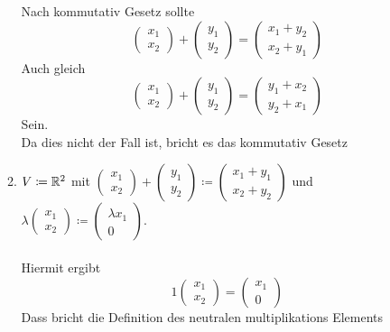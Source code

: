 \documentclass{HM}
\begin{document}
\begin{enumerate}
\begin{enumerate}
Nach kommutativ Gesetz sollte $$\begin{pmatrix}x_1\\x_2\end{pmatrix}+
\begin{pmatrix}y_1\\y_2\end{pmatrix}=
\begin{pmatrix}x_1+y_2\\x_2+y_1\end{pmatrix}$$
Auch gleich
$$\begin{pmatrix}x_1\\x_2\end{pmatrix}+
\begin{pmatrix}y_1\\y_2\end{pmatrix}=
\begin{pmatrix}y_1+x_2\\y_2+x_1\end{pmatrix}$$
Sein.\\
Da dies nicht der Fall ist, bricht es das kommutativ Gesetz\\
\item $V\coloneqq\mathbb{R}^2$ mit $\begin{pmatrix}
x_1\\
x_2
\end{pmatrix}+\begin{pmatrix}
y_1\\
y_2
\end{pmatrix}\coloneqq\begin{pmatrix}
x_1+y_1\\
x_2+y_2
\end{pmatrix}$ und $\lambda\begin{pmatrix}
x_1\\
x_2
\end{pmatrix}\coloneqq\begin{pmatrix}
\lambda x_1\\
0
\end{pmatrix}$.\\\\
Hiermit ergibt
$$1\begin{pmatrix}x_1\\x_2\end{pmatrix}=
\begin{pmatrix}x_1\\0\end{pmatrix}$$
Dass bricht die Definition des neutralen multiplikations Elements
\\

\end{enumerate}
\end{enumerate}
\end{document}
